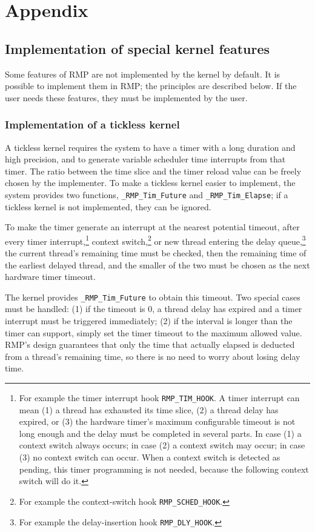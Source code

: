 \chapter{Appendix}\label{ch:appendix}

\section{Implementation of special kernel features}

Some features of RMP are not implemented by the kernel by default.
It is possible to implement them in RMP; the principles are described below.
If the user needs these features, they must be implemented by the user.

\subsection{Implementation of a tickless kernel}

A tickless kernel requires the system to have a timer with a long duration and high precision, and to generate variable scheduler time interrupts from that timer.
The ratio between the time slice and the timer reload value can be freely chosen by the implementer.
To make a tickless kernel easier to implement, the system provides two functions, \texttt{\_RMP\_Tim\_Future} and \texttt{\_RMP\_Tim\_Elapse}; if a tickless kernel is not implemented, they can be ignored.

To make the timer generate an interrupt at the nearest potential timeout, after every timer interrupt,\footnote{For example the timer interrupt hook \texttt{RMP\_TIM\_HOOK}. A timer interrupt can mean (1) a thread has exhausted its time slice, (2) a thread delay has expired, or (3) the hardware timer's maximum configurable timeout is not long enough and the delay must be completed in several parts. In case (1) a context switch always occurs; in case (2) a context switch may occur; in case (3) no context switch can occur. When a context switch is detected as pending, this timer programming is not needed, because the following context switch will do it.} context switch,\footnote{For example the context-switch hook \texttt{RMP\_SCHED\_HOOK}.} or new thread entering the delay queue,\footnote{For example the delay-insertion hook \texttt{RMP\_DLY\_HOOK}.} the current thread's remaining time must be checked, then the remaining time of the earliest delayed thread, and the smaller of the two must be chosen as the next hardware timer timeout.

The kernel provides \texttt{\_RMP\_Tim\_Future} to obtain this timeout.
Two special cases must be handled: (1) if the timeout is 0, a thread delay has expired and a timer interrupt must be triggered immediately; (2) if the interval is longer than the timer can support, simply set the timer timeout to the maximum allowed value.
RMP's design guarantees that only the time that actually elapsed is deducted from a thread's remaining time, so there is no need to worry about losing delay time.

